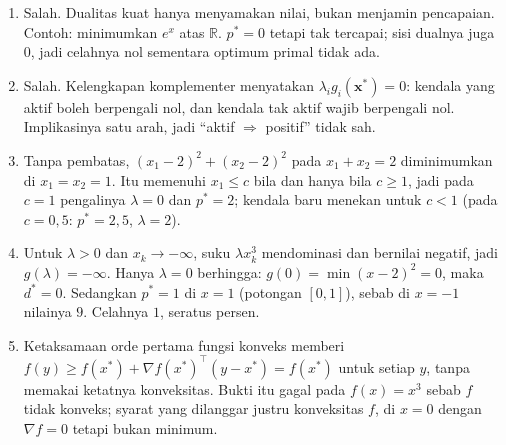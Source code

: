 \begin{enumerate}[label=\textbf{23.\arabic*}]
  \item Salah. Dualitas kuat hanya menyamakan nilai, bukan menjamin pencapaian.
        Contoh: minimumkan $e^{x}$ atas $\mathbb{R}$. $p^{*}=0$ tetapi tak tercapai;
        sisi dualnya juga $0$, jadi celahnya nol sementara optimum primal tidak ada.

  \item Salah. Kelengkapan komplementer menyatakan $\lambda_{i}g_{i}(\mathbf{x}^{*})=0$:
        kendala yang aktif boleh berpengali nol, dan kendala tak aktif wajib
        berpengali nol. Implikasinya satu arah, jadi ``aktif $\Rightarrow$ positif''
        tidak sah.

  \item Tanpa pembatas, $(x_{1}-2)^{2}+(x_{2}-2)^{2}$ pada $x_{1}+x_{2}=2$ diminimumkan
        di $x_{1}=x_{2}=1$. Itu memenuhi $x_{1}\le c$ bila dan hanya bila $c\ge1$, jadi
        pada $c=1$ pengalinya $\lambda=0$ dan $p^{*}=2$; kendala baru menekan untuk
        $c<1$ (pada $c=0{,}5$: $p^{*}=2{,}5$, $\lambda=2$).

  \item Untuk $\lambda>0$ dan $x_{k}\to-\infty$, suku $\lambda x_{k}^{3}$ mendominasi
        dan bernilai negatif, jadi $g(\lambda)=-\infty$. Hanya $\lambda=0$ berhingga:
        $g(0)=\min(x-2)^{2}=0$, maka $d^{*}=0$. Sedangkan $p^{*}=1$ di $x=1$ (potongan
        $[0,1]$), sebab di $x=-1$ nilainya $9$. Celahnya $1$, seratus persen.

  \item Ketaksamaan orde pertama fungsi konveks memberi
        $f(y)\ge f(x^{*})+\nabla f(x^{*})^{\top}(y-x^{*})=f(x^{*})$ untuk setiap $y$,
        tanpa memakai ketatnya konveksitas. Bukti itu gagal pada $f(x)=x^{3}$ sebab
        $f$ tidak konveks; syarat yang dilanggar justru konveksitas $f$, di $x=0$
        dengan $\nabla f=0$ tetapi bukan minimum.
\end{enumerate}
